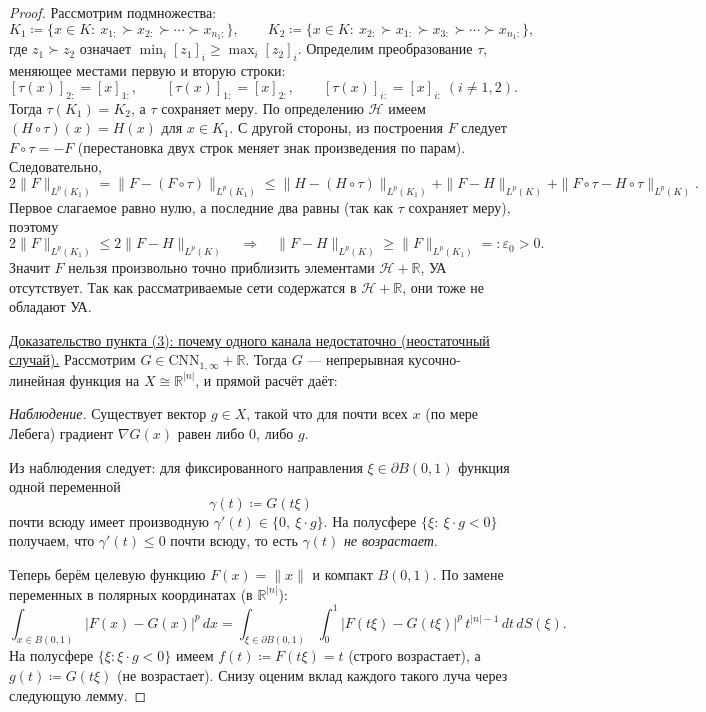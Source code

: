 \documentclass[../NDCNNAI_main.tex]{subfiles}
\begin{document}
\begin{proof}
Рассмотрим подмножества:
\[
K_1\coloneq \{x\in K:\ x_{1:}\succ x_{2:}\succ\cdots\succ x_{n_1:}\},
\qquad
K_2\coloneq \{x\in K:\ x_{2:}\succ x_{1:}\succ x_{3:}\succ\cdots\succ x_{n_1:}\},
\]
где $z_1\succ z_2$ означает $\min_i[z_1]_i\ge \max_i[z_2]_i$.
Определим преобразование $\tau$, меняющее местами первую и вторую строки:
\[
[\tau(x)]_{2:}=[x]_{1:},\qquad [\tau(x)]_{1:}=[x]_{2:},\qquad [\tau(x)]_{i:}=[x]_{i:}\ (i\ne 1,2).
\]
Тогда $\tau(K_1)=K_2$, а $\tau$ сохраняет меру. По определению $\mathcal{H}$ имеем $(H\circ\tau)(x)=H(x)$ для $x\in K_1$.
С другой стороны, из построения $F$ следует $F\circ\tau=-F$ (перестановка двух строк меняет знак произведения по парам).
Следовательно,
\[
2\|F\|_{L^p(K_1)}
=\|F-(F\circ\tau)\|_{L^p(K_1)}
\le \|H-(H\circ\tau)\|_{L^p(K_1)} + \|F-H\|_{L^p(K)} + \|F\circ\tau-H\circ\tau\|_{L^p(K)}.
\]
Первое слагаемое равно нулю, а последние два равны (так как $\tau$ сохраняет меру), поэтому
\[
2\|F\|_{L^p(K_1)}\le 2\|F-H\|_{L^p(K)}\quad\Rightarrow\quad
\|F-H\|_{L^p(K)}\ge \|F\|_{L^p(K_1)}=:\varepsilon_0>0.
\]
Значит $F$ нельзя произвольно точно приблизить элементами $\mathcal{H}+\mathbb{R}$, УА отсутствует.
Так как рассматриваемые сети содержатся в $\mathcal{H}+\mathbb{R}$, они тоже не обладают УА.

\underline{Доказательство пункта (3): почему одного канала недостаточно (неостаточный случай).}
Рассмотрим $G\in \mathrm{CNN}_{1,\infty}+\mathbb{R}$.
Тогда $G$ --- непрерывная кусочно-линейная функция на $X\cong\mathbb{R}^{|n|}$, и прямой расчёт даёт:

\emph{Наблюдение.} Существует вектор $g\in X$, такой что для почти всех $x$ (по мере Лебега) градиент $\nabla G(x)$ равен либо $0$, либо $g$.

Из наблюдения следует: для фиксированного направления $\xi\in \partial B(0,1)$ функция одной переменной
\[
\gamma(t)\coloneq G(t\xi)
\]
почти всюду имеет производную $\gamma'(t)\in\{0,\ \xi\cdot g\}$.
На полусфере $\{\xi:\ \xi\cdot g<0\}$ получаем, что $\gamma'(t)\le 0$ почти всюду, то есть $\gamma(t)$ \emph{не возрастает}.

Теперь берём целевую функцию $F(x)=\|x\|$ и компакт $B(0,1)$.
По замене переменных в полярных координатах (в $\mathbb{R}^{|n|}$):
\begin{equation}
\int_{x\in B(0,1)} |F(x)-G(x)|^p\,dx
=
\int_{\xi\in\partial B(0,1)}\int_0^1 |F(t\xi)-G(t\xi)|^p\,t^{|n|-1}\,dt\,dS(\xi).
\label{eq:polar}
\end{equation}
На полусфере $\{\xi:\xi\cdot g<0\}$ имеем $f(t)\coloneq F(t\xi)=t$ (строго возрастает), а $g(t)\coloneq G(t\xi)$ (не возрастает).
Снизу оценим вклад каждого такого луча через следующую лемму.


\end{proof}
\end{document}
